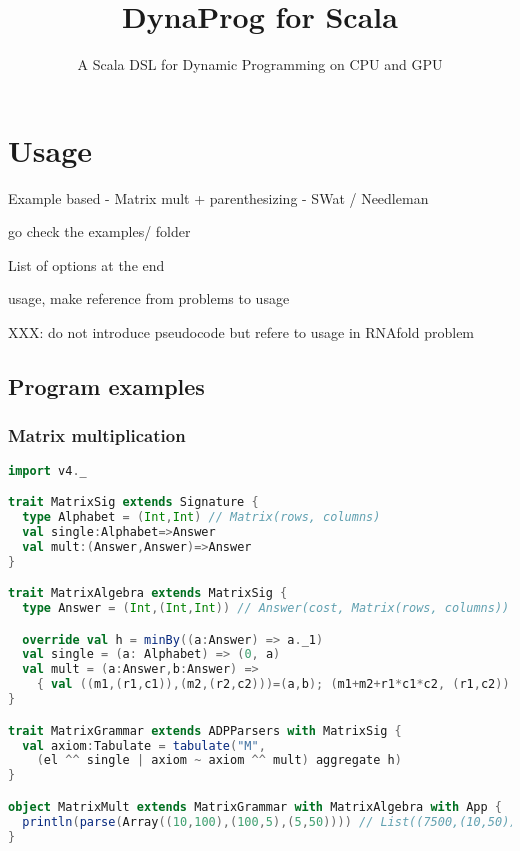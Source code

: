 \documentclass[11pt]{article}
\title{DynaProg for Scala}
\subtitle{A Scala DSL for Dynamic Programming on CPU and GPU}
\begin{document}
\maketitle






\section{Usage} \label{usage}

Example based
- Matrix mult + parenthesizing
- SWat / Needleman

go check the examples/ folder

List of options at the end



{\color{red} usage, make reference from problems to usage

XXX: do not introduce pseudocode but refere to usage in RNAfold problem

}

\subsection{Program examples}
\subsubsection{Matrix multiplication} \label{ex_matmult}
\begin{lstlisting}[language=Scala,caption={Matrix Multiplication}]
import v4._

trait MatrixSig extends Signature {
  type Alphabet = (Int,Int) // Matrix(rows, columns)
  val single:Alphabet=>Answer
  val mult:(Answer,Answer)=>Answer
}

trait MatrixAlgebra extends MatrixSig {
  type Answer = (Int,(Int,Int)) // Answer(cost, Matrix(rows, columns))

  override val h = minBy((a:Answer) => a._1)
  val single = (a: Alphabet) => (0, a)
  val mult = (a:Answer,b:Answer) =>
    { val ((m1,(r1,c1)),(m2,(r2,c2)))=(a,b); (m1+m2+r1*c1*c2, (r1,c2)) }
}

trait MatrixGrammar extends ADPParsers with MatrixSig {
  val axiom:Tabulate = tabulate("M",
    (el ^^ single | axiom ~ axiom ^^ mult) aggregate h)
}

object MatrixMult extends MatrixGrammar with MatrixAlgebra with App {
  println(parse(Array((10,100),(100,5),(5,50)))) // List((7500,(10,50)))
}
\end{lstlisting}
\end{document}
